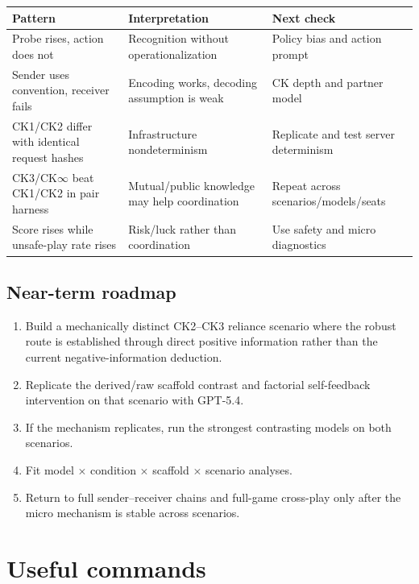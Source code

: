 \documentclass[11pt,a4paper]{article}
\begin{document}
\begin{table}[H]
\centering
\scriptsize
\begin{tabularx}{\textwidth}{p{40mm}YY}
\toprule
Pattern & Interpretation & Next check \\
\midrule
Probe rises, action does not & Recognition without operationalization & Policy bias and action prompt \\
Sender uses convention, receiver fails & Encoding works, decoding assumption is weak & CK depth and partner model \\
CK1/CK2 differ with identical request hashes & Infrastructure nondeterminism & Replicate and test server determinism \\
CK3/CK$\infty$ beat CK1/CK2 in pair harness & Mutual/public knowledge may help coordination & Repeat across scenarios/models/seats \\
Score rises while unsafe-play rate rises & Risk/luck rather than coordination & Use safety and micro diagnostics \\
\bottomrule
\end{tabularx}
\end{table}

\subsection{Near-term roadmap}
\begin{enumerate}
\item Build a mechanically distinct CK2--CK3 reliance scenario where the robust
route is established through direct positive information rather than the current
negative-information deduction.
\item Replicate the derived/raw scaffold contrast and factorial self-feedback
intervention on that scenario with GPT-5.4.
\item If the mechanism replicates, run the strongest contrasting models on both
scenarios.
\item Fit model $\times$ condition $\times$ scaffold $\times$ scenario analyses.
\item Return to full sender--receiver chains and full-game cross-play only after
the micro mechanism is stable across scenarios.
\end{enumerate}

\section{Useful commands}
\end{document}
